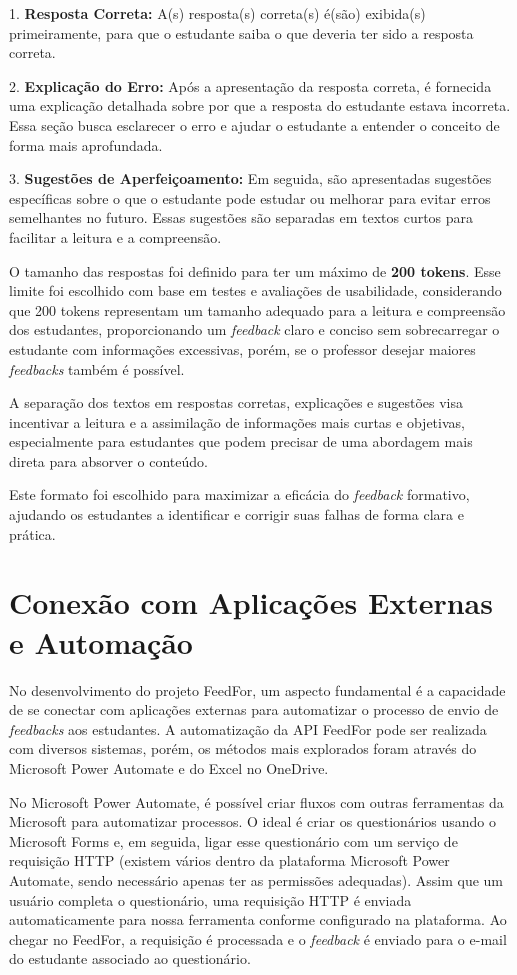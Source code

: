 1. \textbf{Resposta Correta:} A(s) resposta(s) correta(s) é(são) exibida(s) primeiramente, para que o estudante saiba o que deveria ter sido a resposta correta.

2. \textbf{Explicação do Erro:} Após a apresentação da resposta correta, é fornecida uma explicação detalhada sobre por que a resposta do estudante estava incorreta. Essa seção busca esclarecer o erro e ajudar o estudante a entender o conceito de forma mais aprofundada.

3. \textbf{Sugestões de Aperfeiçoamento:} Em seguida, são apresentadas sugestões específicas sobre o que o estudante pode estudar ou melhorar para evitar erros semelhantes no futuro. Essas sugestões são separadas em textos curtos para facilitar a leitura e a compreensão.

O tamanho das respostas foi definido para ter um máximo de \textbf{200 tokens}. Esse limite foi escolhido com base em testes e avaliações de usabilidade, considerando que 200 tokens representam um tamanho adequado para a leitura e compreensão dos estudantes, proporcionando um \textit{feedback} claro e conciso sem sobrecarregar o estudante com informações excessivas, porém, se o professor desejar maiores \textit{feedbacks} também é possível.

A separação dos textos em respostas corretas, explicações e sugestões visa incentivar a leitura e a assimilação de informações mais curtas e objetivas, especialmente para estudantes que podem precisar de uma abordagem mais direta para absorver o conteúdo.

Este formato foi escolhido para maximizar a eficácia do \textit{feedback} formativo, ajudando os estudantes a identificar e corrigir suas falhas de forma clara e prática.

\section{Conexão com Aplicações Externas e Automação}

No desenvolvimento do projeto FeedFor, um aspecto fundamental é a capacidade de se conectar com aplicações externas para automatizar o processo de envio de \textit{feedbacks} aos estudantes. A automatização da API FeedFor pode ser realizada com diversos sistemas, porém, os métodos mais explorados foram através do Microsoft Power Automate e do Excel no OneDrive.

No Microsoft Power Automate, é possível criar fluxos com outras ferramentas da Microsoft para automatizar processos. O ideal é criar os questionários usando o Microsoft Forms e, em seguida, ligar esse questionário com um serviço de requisição HTTP (existem vários dentro da plataforma Microsoft Power Automate, sendo necessário apenas ter as permissões adequadas). Assim que um usuário completa o questionário, uma requisição HTTP é enviada automaticamente para nossa ferramenta conforme configurado na plataforma. Ao chegar no FeedFor, a requisição é processada e o \textit{feedback} é enviado para o e-mail do estudante associado ao questionário.

